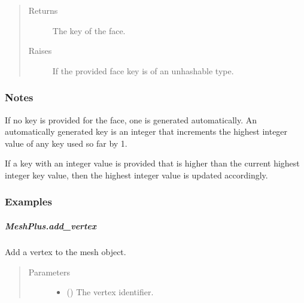 \documentclass[letterpaper,10pt,english]{sphinxmanual}
\begin{document}
\begin{fulllineitems}
\begin{fulllineitems}
\begin{quote}
\begin{description}
\begin{itemize}
\end{itemize}

\item[{Returns}] \leavevmode
{} \textendash{} The key of the face.

\item[{Raises}] \leavevmode
{} \textendash{} If the provided face key is of an unhashable type.

\end{description}\end{quote}
\subsubsection*{Notes}

If no key is provided for the face, one is generated
automatically. An automatically generated key is an integer that increments
the highest integer value of any key used so far by 1.

If a key with an integer value is provided that is higher than the current
highest integer key value, then the highest integer value is updated accordingly.
\subsubsection*{Examples}

\begin{sphinxVerbatim}[commandchars=\\\{\}]
\end{sphinxVerbatim}

\end{fulllineitems}



\subparagraph{MeshPlus.add\_vertex}
\label{\detokenize{api/generated/directional_clustering.mesh.MeshPlus.add_vertex:meshplus-add-vertex}}\label{\detokenize{api/generated/directional_clustering.mesh.MeshPlus.add_vertex::doc}}

\begin{fulllineitems}
\label{\detokenize{api/generated/directional_clustering.mesh.MeshPlus.add_vertex:directional_clustering.mesh.MeshPlus.add_vertex}}
Add a vertex to the mesh object.
\begin{quote}\begin{description}
\item[{Parameters}] \leavevmode\begin{itemize}
\item {} 
 () \textendash{} The vertex identifier.


\end{itemize}
\end{description}
\end{quote}
\end{fulllineitems}
\end{fulllineitems}
\end{document}
